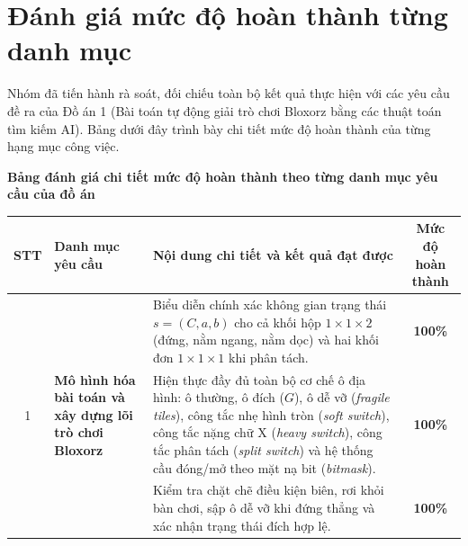 \chapter*{Đánh giá mức độ hoàn thành từng danh mục}
{}

Nhóm đã tiến hành rà soát, đối chiếu toàn bộ kết quả thực hiện với các yêu cầu đề ra của Đồ án 1 (Bài toán tự động giải trò chơi Bloxorz bằng các thuật toán tìm kiếm AI). Bảng dưới đây trình bày chi tiết mức độ hoàn thành của từng hạng mục công việc.

\begin{center}
\textbf{Bảng đánh giá chi tiết mức độ hoàn thành theo từng danh mục yêu cầu của đồ án}
\vspace{6pt}

\begingroup
\footnotesize
\setlength{\tabcolsep}{5pt}
\renewcommand{\arraystretch}{1.35}
\begin{tabularx}{\textwidth}{|c|p{}|X|c|}
\hline
\rowcolor{gray!15}
\textbf{STT} & \textbf{Danh mục yêu cầu} & \textbf{Nội dung chi tiết và kết quả đạt được} & \textbf{Mức độ hoàn thành} \\
\hline
\multirow{3}{*}{1} & \multirow{3}{=}{\textbf{Mô hình hóa bài toán và xây dựng lõi trò chơi Bloxorz}} 
& Biểu diễn chính xác không gian trạng thái $s = (C, a, b)$ cho cả khối hộp $1 \times 1 \times 2$ (đứng, nằm ngang, nằm dọc) và hai khối đơn $1 \times 1 \times 1$ khi phân tách. & \textbf{100\%} \\
\cline{3-4}
& & Hiện thực đầy đủ toàn bộ cơ chế ô địa hình: ô thường, ô đích ($G$), ô dễ vỡ (\textit{fragile tiles}), công tắc nhẹ hình tròn (\textit{soft switch}), công tắc nặng chữ X (\textit{heavy switch}), công tắc phân tách (\textit{split switch}) và hệ thống cầu đóng/mở theo mặt nạ bit (\textit{bitmask}). & \textbf{100\%} \\
\cline{3-4}
& & Kiểm tra chặt chẽ điều kiện biên, rơi khỏi bàn chơi, sập ô dễ vỡ khi đứng thẳng và xác nhận trạng thái đích hợp lệ. & \textbf{100\%} \\
\hline


\end{tabularx}
\end{center}
